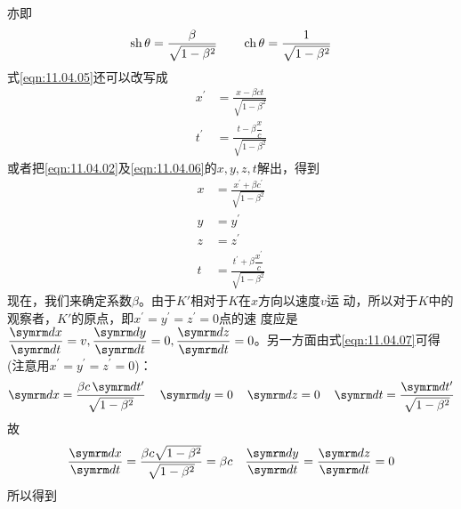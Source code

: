 \noindent
亦即\vspace{-1.56em}
\begin{equation*}
    \operatorname{sh} \theta = \frac { \beta } { \sqrt { 1 - \beta ^ { 2 } } }  \qquad
\operatorname{ch} \theta = \frac { 1 } { \sqrt { 1 - \beta ^ { 2 } } }
\end{equation*}
式\eqref{eqn:11.04.05}还可以改写成
\begin{equation}\label{eqn:11.04.06}
    \begin{split}
        x ^ { \prime } &= \frac { x - \beta c t } { \sqrt { 1 - \beta ^ { 2 } } }  \\
t ^ { \prime } &= \frac { t - \beta \dfrac x c } { \sqrt { 1 - \beta ^ { 2 } } }
    \end{split}
\end{equation}
或者把\eqref{eqn:11.04.02}及\eqref{eqn:11.04.06}的$ x, y, z, t $解出，得到
\begin{equation}\label{eqn:11.04.07}
    \begin{split}
        x &= \frac { x ^ { \prime } + \beta c ^ { \prime } } { \sqrt { 1 - \beta ^ { 2 } } }  \\
y &= y ^ { \prime }  \\
z &= z ^ { \prime }  \\[-0.5em]
t &= \frac { t ^ { \prime } + \beta \dfrac { x ^ \prime } { c } } { \sqrt { 1 - \beta ^ { 2 } } }
    \end{split}
\end{equation}
现在，我们来确定系数$\beta$。由于$ K' $相对于$ K $在$ x $方向以速度$ v $运
动，所以对于$ K $中的观察者，$ K' $的原点，即$  x ^ { \prime } = y ^ { \prime } = z ^ { \prime } = 0   $点的速
度应是$  \dfrac { \dif x } {  \dif t } = v, \dfrac {  \dif y } {  \dif t } = 0, \dfrac {  \dif z } {  \dif t } = 0   $。另一方面由式\eqref{eqn:11.04.07}可得
(注意用$  x ^ { \prime } = y ^ { \prime } = z ^ { \prime } = 0 $)：
\begin{equation*}
    \dif x = \frac { \beta c  \dif t ^ { \prime } } { \sqrt { 1 - \beta ^ { 2 } }} \quad \dif y = 0 \quad \dif z = 0 \quad \dif t = \frac {  \dif t ^ { \prime } } { \sqrt { 1 - \beta ^ { 2 } } }
\end{equation*}
故\vspace{-1.56em}
\begin{equation*}
        \frac {  \dif x } {  \dif t } = \frac { \beta c \sqrt { 1 - \beta ^ { 2 } } } { \sqrt { 1 - \beta ^ { 2 } } } = \beta c \quad \frac {  \dif y } {  \dif t } = \frac {  \dif z } {  \dif t } = 0
\end{equation*}
所以得到\vspace{-1.56em}
